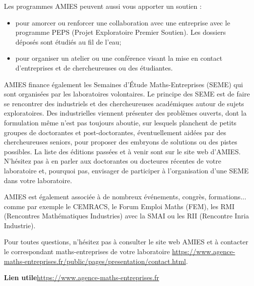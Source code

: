 Les programmes AMIES peuvent aussi vous apporter un soutien :
\begin{itemize}
\item pour amorcer ou renforcer une collaboration avec une
  entreprise avec le programme PEPS (Projet Exploratoire Premier Soutien). Les dossiers d\'epos\'es sont \'etudi\'es
  au fil de l'eau;
\item   pour organiser un atelier ou une conf\'erence visant la
  mise en contact d'entreprises et de chercheur\mp euse\mp s ou des \'etudiant\mp e\mp s.
\end{itemize}

AMIES finance \'egalement  les Semaines d'\'Etude Maths-Entreprises (SEME) qui sont
organis\'ees par les laboratoires volontaires. 
Le principe des SEME est de faire se rencontrer des industriels et des chercheur\mp euse\mp s acad{\'e}miques 
autour de sujets exploratoires. Des industriel\mp les viennent pr{\'e}senter des probl{\`e}mes ouverts, 
dont la formulation m{\^e}me n'est pas toujours aboutie, 
sur lesquels planchent de petits groupes de doctorant\mp e\mp s et post-doctorant\mp e\mp s, 
{\'e}ventuellement aid{\'e}\mp e\mp s par des chercheur\mp euse\mp s seniors, pour proposer des embryons de solutions ou des pistes possibles.
La liste des {\'e}ditions pass{\'e}es et {\`a} venir sont sur le site web d'AMIES.
N'h\'esitez pas \`a en parler aux doctorant\mp e\mp s ou docteur\mp e\mp s r\'ecent\mp e\mp s de votre laboratoire et,
pourquoi pas, envisager de participer \`a l'organisation d'une SEME dans votre laboratoire. 

AMIES est {\'e}galement associ{\'e}e {\`a} de nombreux {\'e}v{\'e}nements, congr{\`e}s, formations... 
comme par exemple le CEMRACS, le Forum Emploi Maths (FEM), les RMI (Rencontres Math{\'e}matiques Industries) 
avec la SMAI ou les RII (Rencontre Inria Industrie).

Pour toutes questions,  n'h\'esitez pas  \`a consulter le site web AMIES 
et \`a  contacter le correspondant maths-entreprises de votre laboratoire 
\url{https://www.agence-maths-entreprises.fr/public/pages/presentation/contact.html}.

\textbf{Lien utile\hspace{.5em}}\url{https://www.agence-maths-entreprises.fr}




